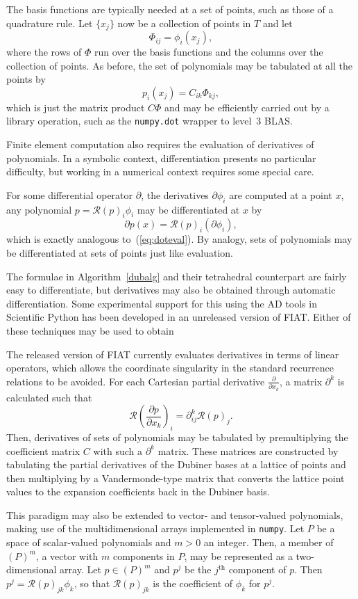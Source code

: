 The basis functions are typically needed at a set of points, such as
those of a quadrature rule.  Let \( \{ x_j \} \) now be a collection of
points in \( T \) and let
\[
  \Phi_{ij} = \phi_i(x_j),
\]
where the rows of \( \Phi \) run over the basis functions and the columns
over the collection of points.  As before, the set of polynomials may
be tabulated at all the points by
\[
p_i(x_j) = C_{ik} \Phi_{kj},
\]
which is just the matrix product \( C \Phi \) and may be efficiently
carried out by a library operation, such as the \texttt{numpy.dot}
wrapper to level~3 BLAS.

Finite element computation also requires the evaluation of derivatives
of polynomials.  In a symbolic context, differentiation presents no
particular difficulty, but working in a numerical context requires some
special care.

For some differential operator \( \partial \), the derivatives \(
\partial \phi_i \) are computed at a point \( x \), any polynomial \(
p = \mathcal{R}(p)_i \phi_i \) may be differentiated at \( x \) by
\[
\partial p(x) = \mathcal{R}(p)_i (\partial \phi_i),
\]
which is exactly analogous to~(\ref{eq:doteval}).  By analogy, sets of
polynomials may be differentiated at sets of points just like evaluation.

The formulae in Algorithm~\ref{dubalg} and their tetrahedral counterpart
are fairly easy to differentiate, but derivatives may also be obtained
through automatic differentiation.  Some experimental support for
this using the AD tools in Scientific Python has been developed in an
unreleased version of FIAT.  Either of these techniques may be used
to obtain

The released version of FIAT currently evaluates derivatives in terms
of linear operators, which allows the coordinate singularity in the
standard recurrence relations to be avoided.  For each Cartesian partial
derivative \( \frac{\partial}{\partial x_k} \), a matrix \( \partial^k \)
is calculated such that
\[
\mathcal{R}\left(\frac{\partial p}{\partial x_k}\right)_i
= \partial^k_{ij} \mathcal{R}(p)_j.
\]
Then, derivatives of sets of polynomials may be tabulated by
premultiplying the coefficient matrix \( C \) with such a \( \partial^k
\) matrix.  These matrices are constructed by tabulating the partial
derivatives of the Dubiner bases at a lattice of points and then
multiplying by a Vandermonde-type matrix that converts the lattice point
values to the expansion coefficients back in the Dubiner basis.

This paradigm may also be extended to vector- and tensor-valued
polynomials, making use of the multidimensional arrays implemented in
\texttt{numpy}.  Let \( P \) be a space of scalar-valued polynomials and
\( m > 0 \) an integer.  Then, a member of \( (P)^m \), a vector with \(
m \) components in \( P \), may be represented as a two-dimensional array.
Let \( p \in (P)^m \) and \( p^j \) be the \( j^\mathrm{th} \) component
of \( p \).  Then \( p^j = \mathcal{R}(p)_{jk} \phi_k \), so that \(
\mathcal{R}(p)_{jk} \) is the coefficient of \( \phi_k \) for \( p^j \).

